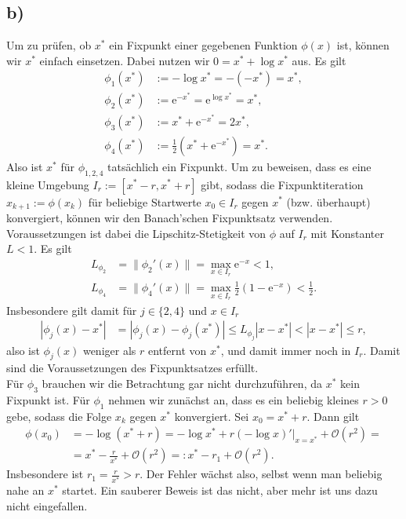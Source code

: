 \documentclass[english, parskip=full]{scrartcl}
\newcommand{\kla}{}
\newcommand{\e}{\text{e}}
\begin{document}
\subsection*{b)}
Um zu prüfen, ob $x^\ast$ ein Fixpunkt einer gegebenen Funktion $\phi(x)$ ist, können wir $x^\ast$ einfach einsetzen.
Dabei nutzen wir $0 = x^\ast + \log x^\ast$ aus.
Es gilt
\begin{align}
\phi_1(x^\ast) &:= -\log x^\ast = - (-x^\ast) = x^\ast,\\
\phi_2(x^\ast) &:= \e^{-x^\ast} = \e^{\log x^\ast} = x^\ast,\\
\phi_3(x^\ast) &:= x^\ast + \e^{-x^\ast} = 2x^\ast,\\
\phi_4(x^\ast) &:= \frac{1}{2}\kla\left( x^\ast + \e^{-x^\ast} \right) = x^\ast.
\end{align}
Also ist $x^\ast$ für $\phi_{1,2,4}$ tatsächlich ein Fixpunkt.
Um zu beweisen, dass es eine kleine Umgebung $I_r := [x^\ast - r, x^\ast + r]$ gibt, sodass die Fixpunktiteration $x_{k+1} := \phi (x_k)$ für beliebige Startwerte $x_0\in I_r$ gegen $x^\ast$ (bzw. überhaupt) konvergiert, können wir den Banach'schen Fixpunktsatz verwenden.
Voraussetzungen ist dabei die Lipschitz-Stetigkeit von $\phi$ auf $I_r$ mit Konstanter $L<1$.
Es gilt
\begin{align}
L_{\phi_2} &= \|\phi_2'(x)\| = \max_{x\in I_r} \e^{-x} < 1,\\
L_{\phi_4} &= \|\phi_4'(x)\| = \max_{x\in I_r} \frac{1}{2}\kla\left( 1 - \e^{-x} \right) < \frac{1}{2}.
\end{align}
Insbesondere gilt damit für $j\in\{2,4\}$ und $x\in I_r$
\begin{align}
|\phi_j(x) - x^\ast| &= |\phi_j(x) - \phi_j(x^\ast)| \le L_{\phi_j} |x-x^\ast| < |x-x^\ast| \le r,
\end{align}
also ist $\phi_j(x)$ weniger als $r$ entfernt von $x^\ast$, und damit immer noch in $I_r$.
Damit sind die Voraussetzungen des Fixpunktsatzes erfüllt.
\\
Für $\phi_3$ brauchen wir die Betrachtung gar nicht durchzuführen, da $x^\ast$ kein Fixpunkt ist. 
Für $\phi_1$ nehmen wir zunächst an, dass es ein beliebig kleines $r>0$ gebe, sodass die Folge $x_k$ gegen $x^\ast$ konvergiert.
Sei $x_0 = x^\ast + r$. 
Dann gilt
\begin{align}
\phi(x_0) &= -\log \kla\left( x^\ast + r \right) = -\log x^\ast + r (-\log x)'\Big\vert_{x=x^\ast} + \mathcal{O}(r^2) = \\
&= x^\ast - \frac{r}{x^\ast} + \mathcal{O}(r^2) =: x^\ast - r_1 + \mathcal{O}(r^2).
\end{align}
Insbesondere ist $r_1 = \frac{r}{x^\ast} > r$.
Der Fehler wächst also, selbst wenn man beliebig nahe an $x^\ast$ startet. 
Ein sauberer Beweis ist das nicht, aber mehr ist uns dazu nicht eingefallen.
\end{document}
